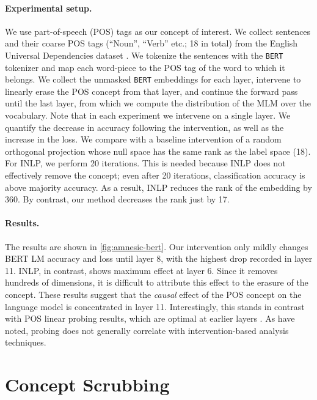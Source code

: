 \documentclass{article}
\theoremstyle{plain}
\theoremstyle{remark}
\theoremstyle{plain}
\theoremstyle{TheoremNum}
\begin{document}
\paragraph{Experimental setup.} We use part-of-speech (POS) tags as our concept of interest. We collect sentences and their coarse POS tags (``Noun'', ``Verb'' etc.; 18 in total) from the English Universal Dependencies dataset \citep{nivre2020universal}. We tokenize the sentences with the \texttt{BERT} tokenizer and map each word-piece to the POS tag of the word to which it belongs. We collect the unmasked \texttt{BERT} embeddings for each layer, intervene to linearly erase the POS concept from that layer, and continue the forward pass until the last layer, from which we compute the distribution of the MLM over the vocabulary. Note that in each experiment we intervene on a single layer. We quantify the decrease in accuracy following the intervention, as well as the increase in the loss. We compare with a baseline intervention of a random orthogonal projection whose null space has the same rank as the label space (18). For INLP, we perform 20 iterations. This is needed because INLP does not effectively remove the concept; even after 20 iterations, classification accuracy is above majority accuracy. As a result, INLP reduces the rank of the embedding by 360. By contrast, our method decreases the rank just by 17.

\paragraph{Results.} The results are shown in \cref{fig:amnesic-bert}. Our intervention only mildly changes BERT LM accuracy and loss until layer 8, with the highest drop recorded in layer 11. INLP, in contrast, shows maximum effect at layer 6. Since it removes hundreds of dimensions, it is difficult to attribute this effect to the erasure of the concept. These results suggest that the \emph{causal} effect of the POS concept on the language model is concentrated in layer 11. Interestingly, this stands in contrast with POS linear probing results, which are optimal at earlier layers \citep{tenney2019bert}. As \citet{elazar2021amnesic} have noted, probing does not generally correlate with intervention-based analysis techniques.

\newpage
\section{Concept Scrubbing}\label{sec:concept-scrubbing}
\end{document}
